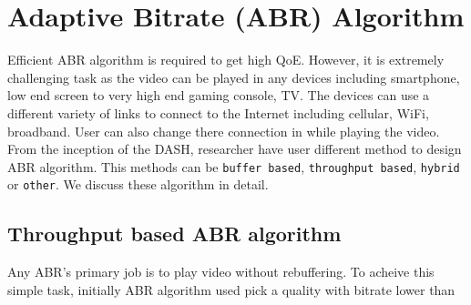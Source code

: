 \section{Adaptive Bitrate (ABR) Algorithm}
Efficient ABR algorithm is required to get high QoE. However, it is extremely challenging task as the video can be played in any devices including smartphone, low end screen to very high end gaming console, TV. The devices can use a different variety of links to connect to the Internet including cellular, WiFi, broadband. User can also change there connection in while playing the video. From the inception of the DASH, researcher have user different method to design ABR algorithm. This methods can be {\tt buffer based}, {\tt throughput based}, {\tt hybrid} or {\tt other}. We discuss these algorithm in detail.

\subsection{Throughput based ABR algorithm}
Any ABR's primary job is to play video without rebuffering. To acheive this simple task, initially ABR algorithm used pick a quality with bitrate lower than 
